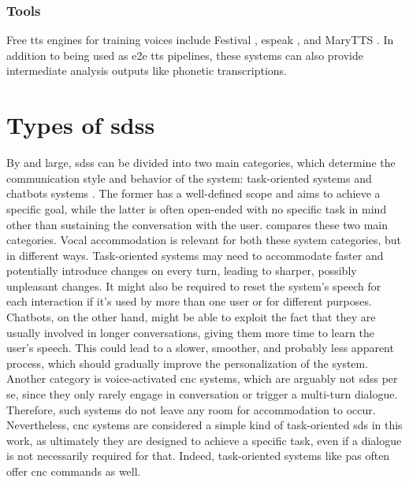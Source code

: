 \subsubsection{Tools}
\label{subsubsec:tools_tts}

Free \ac{tts} engines for training voices include Festival \citep{Black1997festival}, espeak \citep{Duddington2012espeak}, and MaryTTS \citep{Schroder2011open}.
In addition to being used as \ac{e2e} \ac{tts} pipelines, these systems can also provide intermediate analysis outputs like phonetic transcriptions.

\section{Types of \aclp{sds}}
\label{sec:types_of_sdss}

By and large, \acp{sds} can be divided into two main categories, which determine the communication style and behavior of the system: task-oriented systems \citep[e.g.,][]{Wen2016network, Zhao2016towards} and chatbots systems \citep[e.g.,][]{Vinyals2015neural, Li2016deep}.
The former has a well-defined scope and aims to achieve a specific goal, while the latter is often open-ended with no specific task in mind other than sustaining the conversation with the user.
 compares these two main categories.
Vocal accommodation is relevant for both these system categories, but in different ways.
Task-oriented systems may need to accommodate faster and potentially introduce changes on every turn, leading to sharper, possibly unpleasant changes.
It might also be required to reset the system's speech for each interaction if it's used by more than one user or for different purposes.
Chatbots, on the other hand, might be able to exploit the fact that they are usually involved in longer conversations, giving them more time to learn the user's speech.
This could lead to a slower, smoother, and probably less apparent process, which should gradually improve the personalization of the system.
Another category is voice-activated \ac{cnc} systems, which are arguably not \acp{sds} per se, since they only rarely engage in conversation or trigger a multi-turn dialogue.
Therefore, such systems do not leave any room for accommodation to occur.
Nevertheless, \ac{cnc} systems are considered a simple kind of task-oriented \ac{sds} in this work, as ultimately they are designed to achieve a specific task, even if a dialogue is not necessarily required for that.
Indeed, task-oriented systems like \acp{pa} often offer \ac{cnc} commands as well.
